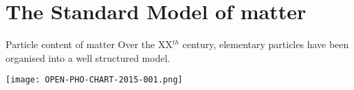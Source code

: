 \section{The Standard Model of matter}
\begin{frame}{Particle content of matter}
    Over the XX$^{th}$ century, elementary particles have been organised into a well structured model.

  \begin{center} \texttt{[image: OPEN-PHO-CHART-2015-001.png]} \end{center}
\end{frame}


  
  
  




